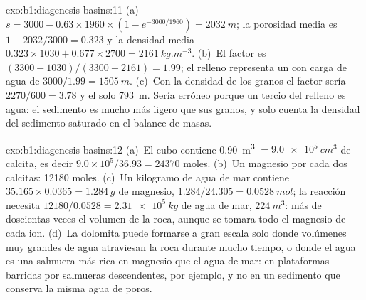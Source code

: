 \begin{solution}{exo:b1:diagenesis-basins:11}
(a)~$s = 3000 - 0.63\times1960\times(1 - e^{-3000/1960}) = \qty{2032}{m}$; la porosidad media es $1 - 2032/3000 = \num{0.323}$ y la densidad media
$0.323\times1030 + 0.677\times2700 = \qty{2161}{kg.m^{-3}}$. (b)~El factor es $(3300 - 1030)/(3300 - 2161) = \num{1.99}$; el relleno representa un 
con carga de agua de $3000/1.99 = \qty{1505}{m}$. (c)~Con la densidad de los granos el factor sería $2270/600 = \num{3.78}$ y el  solo \qty{793}{m}. Sería erróneo porque
un tercio del relleno es agua: el sedimento es mucho más ligero que sus granos, y solo cuenta la densidad del sedimento saturado en el balance de masas.
\end{solution}

\begin{solution}{exo:b1:diagenesis-basins:12}
(a)~El cubo contiene \qty{0.90}{m^3} $= \qty{9.0e5}{cm^3}$ de calcita, es decir $9.0\times10^5/36.93 = \num{24370}$ moles. (b)~Un magnesio por cada dos calcitas:
\num{12180} moles. (c)~Un kilogramo de agua de mar contiene $35.165\times0.0365 =
\qty{1.284}{g}$ de magnesio, $1.284/24.305 = \qty{0.0528}{mol}$; la reacción necesita $12180/0.0528 = \qty{2.31e5}{kg}$ de agua de mar, $\qty{224}{m^3}$: más de doscientas veces
el volumen de la roca, aunque se tomara todo el magnesio de cada ion. (d)~La dolomita puede formarse a gran escala solo donde volúmenes muy grandes de agua atraviesan la roca durante mucho
tiempo, o donde el agua es una salmuera más rica en magnesio que el agua de mar: en plataformas barridas por salmueras descendentes, por ejemplo, y no en un sedimento que conserva la misma agua de poros.
\end{solution}

